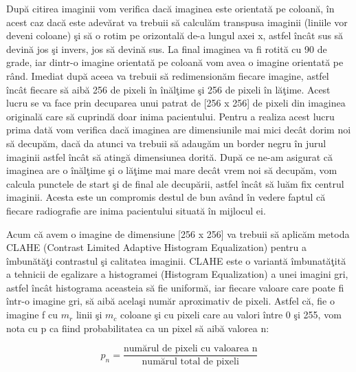 Dup\u{a} citirea imaginii vom verifica dac\u{a} imaginea este orientat\u{a} pe coloan\u{a}, \^{i}n acest caz dac\u{a} este adev\u{a}rat  va trebuii s\u{a} calcul\u{a}m transpusa imaginii (liniile vor deveni coloane) \c{s}i s\u{a} o rotim pe orizontal\u{a} de-a lungul axei x, astfel \^{i}nc\^{a}t sus s\u{a} devin\u{a} jos \c{s}i invers, jos s\u{a} devin\u{a} sus. La final imaginea va fi rotit\u{a} cu 90 de grade, iar dintr-o imagine orientat\u{a} pe coloan\u{a} vom avea o imagine orientat\u{a} pe r\^{a}nd. Imediat dup\u{a} aceea va trebuii s\u{a} redimension\u{a}m fiecare imagine, astfel \^{i}nc\^{a}t fiecare s\u{a} aib\u{a} 256 de pixeli \^{i}n \^{i}n\u{a}l\c{t}ime \c{s}i 256 de pixeli \^{i}n l\u{a}\c{t}ime. Acest lucru se va face prin decuparea unui patrat de [256 x 256] de pixeli din imaginea original\u{a} care s\u{a} cuprind\u{a} doar inima pacientului. Pentru a realiza acest lucru prima dat\u{a} vom verifica dac\u{a} imaginea are dimensiunile mai mici dec\^{a}t dorim noi s\u{a} decup\u{a}m, dac\u{a} da atunci va trebuii s\u{a} adaug\u{a}m un border negru \^{i}n jurul imaginii astfel \^{i}nc\^{a}t s\u{a} ating\u{a} dimensiunea dorit\u{a}. Dup\u{a} ce ne-am asigurat c\u{a} imaginea are o \^{i}n\u{a}l\c{t}ime \c{s}i o l\u{a}\c{t}ime mai mare dec\^{a}t vrem noi s\u{a} decup\u{a}m,  vom calcula punctele de start \c{s}i de final ale decup\u{a}rii, astfel \^{i}nc\^{a}t s\u{a} lu\u{a}m fix centrul imaginii. Acesta este un compromis destul de bun av\^{a}nd \^{i}n vedere faptul c\u{a} fiecare radiografie are inima pacientului situat\u{a} \^{i}n mijlocul ei.

\par

Acum c\u{a} avem o imagine de dimensiune [256 x 256] va trebuii s\u{a} aplic\u{a}m metoda CLAHE (Contrast Limited Adaptive Histogram Equalization) pentru a \^{i}mbun\u{a}t\u{a}\c{t}i contrastul \c{s}i calitatea imaginii. CLAHE este o variant\u{a} \^{i}mbunat\u{a}\c{t}it\u{a} a tehnicii de egalizare a histogramei (Histogram Equalization) a unei imagini gri, astfel \^{i}nc\^{a}t histograma aceasteia s\u{a} fie uniform\u{a}, iar fiecare valoare care poate fi \^{i}ntr-o imagine gri, s\u{a} aib\u{a} acela\c{s}i num\u{a}r aproximativ de pixeli. Astfel c\u{a}, fie o imagine f cu $m_r$ linii \c{s}i $m_c$ coloane \c{s}i cu pixeli care au valori \^{i}ntre 0 \c{s}i 255, vom nota cu p ca fiind probabilitatea ca un pixel s\u{a} aib\u{a} valorea n:

$$p_n = \frac{\text{num\u{a}rul de pixeli cu valoarea n}}{\text{num\u{a}rul total de pixeli}}$$

